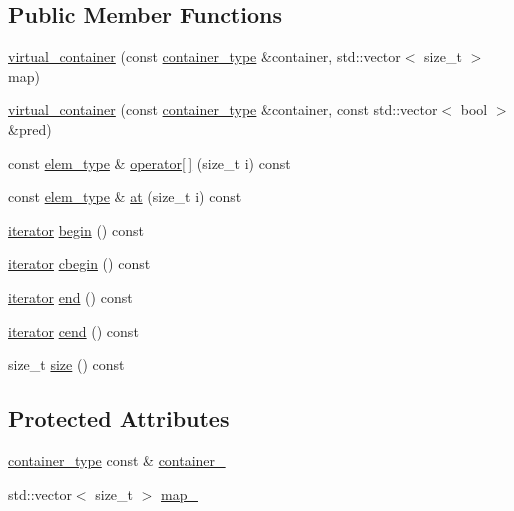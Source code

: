 \subsection*{Public Member Functions}
\begin{DoxyCompactItemize}
\item 
\hyperlink{classmui_1_1virtual__container_ae1b44658f8ef2a5d26984be46209cc67}{virtual\+\_\+container} (const \hyperlink{classmui_1_1virtual__container_a4f84af2177deb7ad3664c6f5935164be}{container\+\_\+type} \&container, std\+::vector$<$ size\+\_\+t $>$ map)
\item 
\hyperlink{classmui_1_1virtual__container_a1136dbe62bc392d79eed0f12878e2227}{virtual\+\_\+container} (const \hyperlink{classmui_1_1virtual__container_a4f84af2177deb7ad3664c6f5935164be}{container\+\_\+type} \&container, const std\+::vector$<$ bool $>$ \&pred)
\item 
const \hyperlink{classmui_1_1virtual__container_a5539ad526cf676a5852858dd8da7eca2}{elem\+\_\+type} \& \hyperlink{classmui_1_1virtual__container_a6a56abd3edb58038f9223e3bd0c3d3fa}{operator\mbox{[}$\,$\mbox{]}} (size\+\_\+t i) const
\item 
const \hyperlink{classmui_1_1virtual__container_a5539ad526cf676a5852858dd8da7eca2}{elem\+\_\+type} \& \hyperlink{classmui_1_1virtual__container_a6457905be422abf54753a1573110f1bf}{at} (size\+\_\+t i) const
\item 
\hyperlink{classmui_1_1virtual__container_ab8a791b2f30b5a59f0bcc06b417d10fc}{iterator} \hyperlink{classmui_1_1virtual__container_a399a540ce08893a5b39e270fbd22f547}{begin} () const
\item 
\hyperlink{classmui_1_1virtual__container_ab8a791b2f30b5a59f0bcc06b417d10fc}{iterator} \hyperlink{classmui_1_1virtual__container_ab25d7d316e92bcc77b9b30de829234db}{cbegin} () const
\item 
\hyperlink{classmui_1_1virtual__container_ab8a791b2f30b5a59f0bcc06b417d10fc}{iterator} \hyperlink{classmui_1_1virtual__container_a62bfabdabdfbef922d63a4ffa72255a7}{end} () const
\item 
\hyperlink{classmui_1_1virtual__container_ab8a791b2f30b5a59f0bcc06b417d10fc}{iterator} \hyperlink{classmui_1_1virtual__container_a87cfc003f2b57359a72857907aaa2054}{cend} () const
\item 
size\+\_\+t \hyperlink{classmui_1_1virtual__container_aedfdc7844490d780ba1770ee53a8b53c}{size} () const
\end{DoxyCompactItemize}
\subsection*{Protected Attributes}
\begin{DoxyCompactItemize}
\item 
\hyperlink{classmui_1_1virtual__container_a4f84af2177deb7ad3664c6f5935164be}{container\+\_\+type} const  \& \hyperlink{classmui_1_1virtual__container_ad1848bae24f0af798fab9ecce71612dc}{container\+\_\+}
\item 
std\+::vector$<$ size\+\_\+t $>$ \hyperlink{classmui_1_1virtual__container_af790242e0079d907acb89b12bdf9cd1f}{map\+\_\+}
\end{DoxyCompactItemize}


